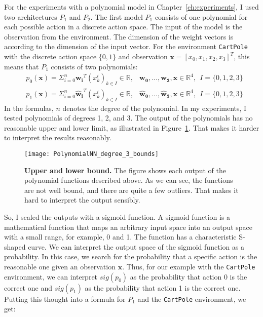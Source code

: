 For the experiments with a polynomial model in Chapter~\ref{ch:experiments}, I used two architectures $P_1$ and $P_2$. The first model $P_1$ consists of one polynomial for each possible action in a discrete action space. The input of the model is the observation from the environment. The dimension of the weight vectors is according to the dimension of the input vector. For the environment \verb|CartPole| with the discrete action space $\{0, 1\}$ and observation $\mathbf{x} = [x_0, x_1, x_2, x_3]^T$, this means that $P_1$ consists of two polynomials:
\begin{align*}
  &p_0(\mathbf{x}) = \Sigma_{i=0}^{n} \mathbf{w_i}^T (x_k^i)_{k \in I} \in \mathbb{R}, &\mathbf{w_0}, ..., \mathbf{w_3}, \mathbf{x} \in \mathbb{R}^4, \ \ I = \{0, 1, 2, 3\} \\
  &p_1(\mathbf{x}) = \Sigma_{i=0}^{n} \mathbf{\hat{w}_i}^T (x_k^i)_{k \in I} \in \mathbb{R}, &\mathbf{\hat{w}_0}, ..., \mathbf{\hat{w}_3}, \mathbf{x} \in \mathbb{R}^4, \ \ I = \{0, 1, 2, 3\}
\end{align*}
In the formulas, $n$ denotes the degree of the polynomial. In my experiments, I tested polynomials of degrees 1, 2, and 3. The output of the polynomials has no reasonable upper and lower limit, as illustrated in Figure~\ref{fig:bounds}. That makes it harder to interpret the results reasonably.
\begin{figure}[ht]
\centering
\texttt{[image: PolynomialNN\_degree\_3\_bounds]}
\caption[Upper and lower bound]{
  \textbf{Upper and lower bound.}
  The figure shows each output of the polynomial functions described above. As we can see, the functions are not well bound, and there are quite a few outliers. That makes it hard to interpret the output sensibly.
}
\label{fig:bounds}
\end{figure}
So, I scaled the outputs with a sigmoid function. A sigmoid function is a mathematical function that maps an arbitrary input space into an output space with a small range, for example, 0 and 1. The function has a characteristic S-shaped curve. We can interpret the output space of the sigmoid function as a probability. In this case, we search for the probability that a specific action is the reasonable one given an observation $\mathbf{x}$. Thus, for our example with the \verb|CartPole| environment, we can interpret $sig(p_0)$ as the probability that action 0 is the correct one and $sig(p_1)$ as the probability that action 1 is the correct one. Putting this thought into a formula for $P_1$ and the \verb|CartPole| environment, we get:
